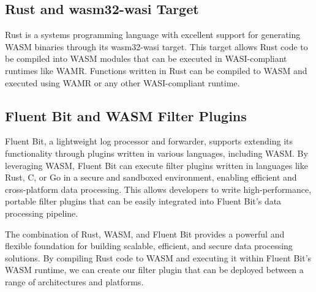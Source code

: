 \subsection{Rust and wasm32-wasi Target}
Rust is a systems programming language with excellent support for generating WASM binaries through its wasm32-wasi target. This target allows Rust code to be compiled into WASM modules that can be executed in WASI-compliant runtimes like WAMR. Functions written in Rust can be compiled to WASM and executed using WAMR or any other WASI-compliant runtime.

\subsection{Fluent Bit and WASM Filter Plugins}
Fluent Bit, a lightweight log processor and forwarder, supports extending its functionality through plugins written in various languages, including WASM. By leveraging WASM, Fluent Bit can execute filter plugins written in languages like Rust, C, or Go in a secure and sandboxed environment, enabling efficient and cross-platform data processing. This allows developers to write high-performance, portable filter plugins that can be easily integrated into Fluent Bit's data processing pipeline.

The combination of Rust, WASM, and Fluent Bit provides a powerful and flexible foundation for building scalable, efficient, and secure data processing solutions. By compiling Rust code to WASM and executing it within Fluent Bit's WASM runtime, we can create our filter plugin that can be deployed between a range of architectures and platforms.
